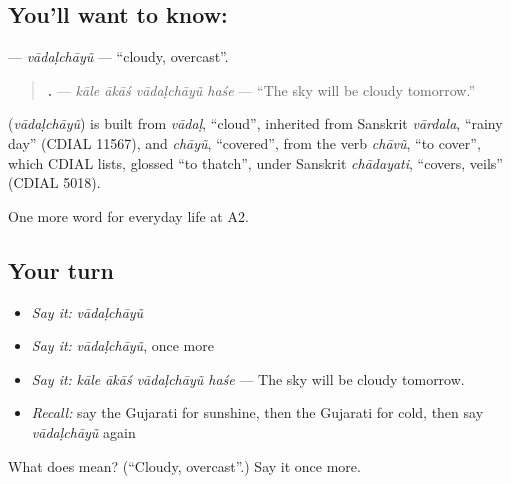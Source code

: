 \subsection*{You'll want to know: }
\textbf{} — \emph{vādaḷchāyũ} — \textquotedblleft{}cloudy, overcast\textquotedblright{}.

\begin{quote}
\textbf{   .} — \emph{kāle ākāś vādaḷchāyũ haśe} — \textquotedblleft{}The sky will be cloudy tomorrow.\textquotedblright{}
\end{quote}

\begin{cousinweb}
\textbf{} (\emph{vādaḷchāyũ}) is built from \emph{vādaḷ}, \textquotedblleft{}cloud\textquotedblright{}, inherited from Sanskrit \emph{vārdala}, \textquotedblleft{}rainy day\textquotedblright{} (CDIAL 11567), and \emph{chāyũ}, \textquotedblleft{}covered\textquotedblright{}, from the verb \emph{chāvũ}, \textquotedblleft{}to cover\textquotedblright{}, which CDIAL lists, glossed \textquotedblleft{}to thatch\textquotedblright{}, under Sanskrit \emph{chādayati}, \textquotedblleft{}covers, veils\textquotedblright{} (CDIAL 5018).
\end{cousinweb}

\begin{grammarlens}[title={What you've built}]
One more word for everyday life at A2.
\end{grammarlens}

\subsection*{Your turn}
\begin{itemize}
\raggedright
  \item \emph{Say it:} \emph{vādaḷchāyũ}
  \item \emph{Say it:} \emph{vādaḷchāyũ}, once more
  \item \emph{Say it:} \emph{kāle ākāś vādaḷchāyũ haśe} — The sky will be cloudy tomorrow.
  \item \emph{Recall:} say the Gujarati for sunshine, then the Gujarati for cold, then say \emph{vādaḷchāyũ} again
\end{itemize}

\begin{tcolorbox}[breakable,colback=teal!4,colframe=teal!35!black,title={Before you move on}]
What does  mean? (\textquotedblleft{}Cloudy, overcast\textquotedblright{}.) Say it once more.
\end{tcolorbox}
